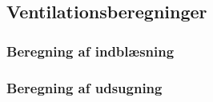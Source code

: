 \subsection{Ventilationsberegninger}
\label{sub:ventilationsberegninger}

\subsubsection{Beregning af indblæsning}
\label{subsub:indblaesning_beregning}


\subsubsection{Beregning af udsugning}
\label{subsub:udsugning_beregning}